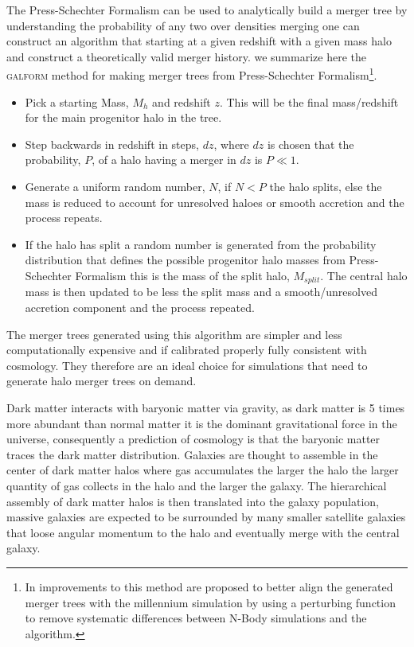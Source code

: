 The Press-Schechter Formalism can be used to analytically build a merger tree by understanding the probability of any two over densities merging one can construct an algorithm that starting at a given redshift with a given mass halo and construct a theoretically valid merger history. we summarize here the \textsc{galform} \citep{Cole2000} method for making merger trees from Press-Schechter Formalism\footnote{In \citet{Parkinson2008GeneratingTrees} improvements to this method are proposed to better align the generated merger trees with the millennium simulation by using a perturbing function to remove systematic differences between N-Body simulations and the algorithm.}.

\begin{itemize}
    \item Pick a starting Mass, $M_{h}$ and redshift $z$. This will be the final mass/redshift for the main progenitor halo in the tree.
    \item Step backwards in redshift in steps, $dz$, where $dz$ is chosen that the probability, $P$, of a halo having a merger in $dz$ is $P\ll1$.
    \item Generate a uniform random number, $N$, if $N<P$ the halo splits, else the mass is reduced to account for unresolved haloes or smooth accretion and the process repeats.
    \item If the halo has split a random number is generated from the probability distribution that defines the possible progenitor halo masses from  Press-Schechter Formalism this is the mass of the split halo, $M_{split}$. The central halo mass is then updated to be less the split mass and a smooth/unresolved accretion component and the process repeated.
\end{itemize}

The merger trees generated using this algorithm are simpler and less computationally expensive and if calibrated properly fully consistent with \LCDM cosmology. They therefore are an ideal choice for simulations that need to generate halo merger trees on demand.

Dark matter interacts with baryonic matter via gravity, as dark matter is 5 times more abundant than normal matter it is the dominant gravitational force in the universe, consequently a prediction of \LCDM cosmology is that the baryonic matter traces the dark matter distribution. Galaxies are thought to assemble in the center of dark matter halos where gas accumulates the larger the halo the larger quantity of gas collects in the halo and the larger the galaxy. The hierarchical assembly of dark matter halos is then translated into the galaxy population, massive galaxies are expected to be surrounded by many smaller satellite galaxies that loose angular momentum to the halo and eventually merge with the central galaxy.

